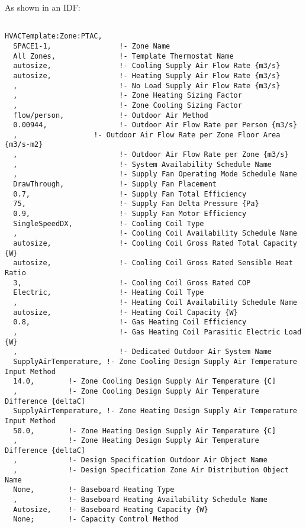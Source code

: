 As shown in an IDF:

\begin{lstlisting}

HVACTemplate:Zone:PTAC,
  SPACE1-1,                !- Zone Name
  All Zones,               !- Template Thermostat Name
  autosize,                !- Cooling Supply Air Flow Rate {m3/s}
  autosize,                !- Heating Supply Air Flow Rate {m3/s}
  ,                        !- No Load Supply Air Flow Rate {m3/s}
  ,                        !- Zone Heating Sizing Factor
  ,                        !- Zone Cooling Sizing Factor
  flow/person,             !- Outdoor Air Method
  0.00944,                 !- Outdoor Air Flow Rate per Person {m3/s}
  ,                  !- Outdoor Air Flow Rate per Zone Floor Area {m3/s-m2}
  ,                        !- Outdoor Air Flow Rate per Zone {m3/s}
  ,                        !- System Availability Schedule Name
  ,                        !- Supply Fan Operating Mode Schedule Name
  DrawThrough,             !- Supply Fan Placement
  0.7,                     !- Supply Fan Total Efficiency
  75,                      !- Supply Fan Delta Pressure {Pa}
  0.9,                     !- Supply Fan Motor Efficiency
  SingleSpeedDX,           !- Cooling Coil Type
  ,                        !- Cooling Coil Availability Schedule Name
  autosize,                !- Cooling Coil Gross Rated Total Capacity {W}
  autosize,                !- Cooling Coil Gross Rated Sensible Heat Ratio
  3,                       !- Cooling Coil Gross Rated COP
  Electric,                !- Heating Coil Type
  ,                        !- Heating Coil Availability Schedule Name
  autosize,                !- Heating Coil Capacity {W}
  0.8,                     !- Gas Heating Coil Efficiency
  ,                        !- Gas Heating Coil Parasitic Electric Load {W}
  ,                        !- Dedicated Outdoor Air System Name
  SupplyAirTemperature, !- Zone Cooling Design Supply Air Temperature Input Method
  14.0,        !- Zone Cooling Design Supply Air Temperature {C]
  ,            !- Zone Cooling Design Supply Air Temperature Difference {deltaC]
  SupplyAirTemperature, !- Zone Heating Design Supply Air Temperature Input Method
  50.0,        !- Zone Heating Design Supply Air Temperature {C]
  ,            !- Zone Heating Design Supply Air Temperature Difference {deltaC]
  ,            !- Design Specification Outdoor Air Object Name
  ,            !- Design Specification Zone Air Distribution Object Name
  None,        !- Baseboard Heating Type
  ,            !- Baseboard Heating Availability Schedule Name
  Autosize,    !- Baseboard Heating Capacity {W}
  None;        !- Capacity Control Method
\end{lstlisting}

